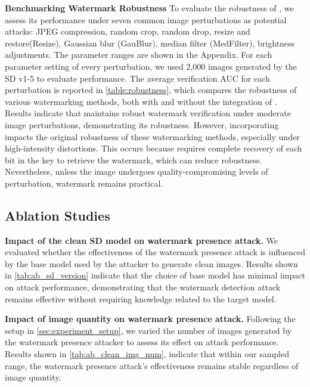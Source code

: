 
\noindent
\textbf{Benchmarking Watermark Robustness}
\label{sec:robustness_exp}
To evaluate the robustness of \tool, we assess its performance under seven common image perturbations as potential attacks: JPEG compression, random crop, random drop, resize and restore(Resize), Gaussian blur (GauBlur), median filter (MedFilter), brightness adjustments. The parameter ranges are shown in the Appendix.
For each parameter setting of every perturbation, we used 2,000 images generated by the SD v1-5 to evaluate performance. The average verification AUC for each perturbation is reported in \cref{table:robustness}, which compares the robustness of various watermarking methods, both with and without the integration of \tool.
Results indicate that \tool maintains robust watermark verification under moderate image perturbations, demonstrating its robustness. However, incorporating \tool impacts the original robustness of these watermarking methods, especially under high-intensity distortions. This occurs because \tool requires complete recovery of each bit in the key to retrieve the watermark, which can reduce robustness. Nevertheless, unless the image undergoes quality-compromising levels of perturbation, watermark remains practical. 

\subsection{Ablation Studies}
\label{sec:ablation_studies}



\noindent
\textbf{Impact of the clean SD model on watermark presence attack.} 
We evaluated whether the effectiveness of the watermark presence attack is influenced by the base model used by the attacker to generate clean images. Results shown in \cref{tab:ab_sd_version} indicate that the choice of base model has minimal impact on attack performance, demonstrating that the watermark detection attack remains effective without requiring knowledge related to the target model.



\noindent
\textbf{Impact of image quantity on watermark presence attack.} 
Following the setup in \cref{sec:experiment_setup}, we varied the number of images generated by the watermark presence attacker to assess its effect on attack performance. Results shown in \cref{tab:ab_clean_img_num}, indicate that within our sampled range, the watermark presence attack's effectiveness remains stable regardless of image quantity. 

